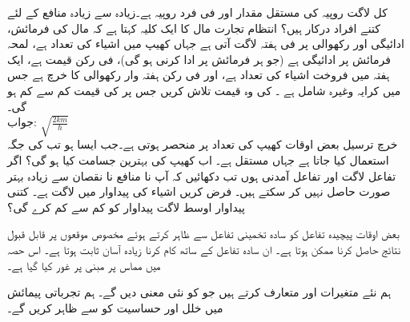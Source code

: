 کل لاگت   روپیہ کی مستقل مقدار اور فی فرد  روپیہ ہے۔زیادہ سے زیادہ منافع کے لئے کتنے افراد درکار ہیں؟   
انتظام تجارت مال کا ایک کلیہ کہتا ہے کہ مال کی فرمائش، ادائیگی اور رکھوالی پر  فی ہفتہ  لاگت آتی ہے جہاں  کھیپ میں اشیاء کی تعداد ہے،  لمحہ فرمائش پر ادائیگی ہے (جو ہر فرمائش پر ادا کرنی ہو گی)،  فی رکن قیمت ہے،  ایک ہفتہ میں فروخت اشیاء کی تعداد ہے، اور  فی رکن ہفتہ وار رکھوالی کا خرچ ہے جس میں کرایہ وغیرہ شامل ہے ۔  کی وہ قیمت تلاش کریں جس پر   کی قیمت کم سے کم ہو گی۔\\
جواب:\quad
$\sqrt{\tfrac{2km}{h}}$
\\
خرچ ترسیل بعض اوقات کھیپ کی تعداد پر منحصر ہوتی ہے۔جب ایسا ہو تب  کی جگہ  استعمال کیا جاتا ہے جہاں  مستقل ہے۔ اب کھیپ کی بہترین جسامت کیا ہو گی؟
اگر تفاعل لاگت  اور  تفاعل آمدنی  ہوں تب دکھائیں کہ  آپ نا منافع نا نقصان سے زیادہ بہتر صورت حاصل نہیں  کر سکتے ہیں۔  
فرض کریں  اشیاء کی پیداوار  میں لاگت  ہے۔ کتنی پیداوار اوسط لاگت پیداوار کو کم سے کم کرے گی؟

بعض اوقات پیچیدہ تفاعل کو سادہ تخمینی تفاعل سے  ظاہر کرتے ہوئے مخصوص موقعوں پر قابل قبول نتائج حاصل کرنا ممکن ہوتا ہے۔ ان سادہ تفاعل کے ساتھ کام کرنا زیادہ آسان ثابت ہوتا ہے۔ اس حصہ میں مماس پر مبنی  پر غور کیا گیا ہے۔

ہم نئے متغیرات  اور  متعارف کرتے ہیں جو  کو نئی معنی دیں گے۔  ہم تجرباتی پیمائش میں خلل اور حساسیت  کو  سے ظاہر کریں گے۔


